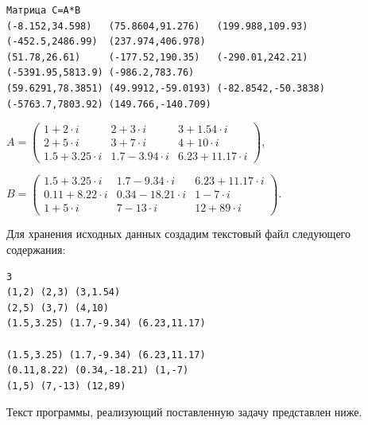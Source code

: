 \begin{verbatim}
Матрица C=A*B
(-8.152,34.598)   (75.8604,91.276)   (199.988,109.93)    (-452.5,2486.99)  (237.974,406.978)
(51.78,26.61)     (-177.52,190.35)   (-290.01,242.21)    (-5391.95,5813.9) (-986.2,783.76)
(59.6291,78.3851) (49.9912,-59.0193) (-82.8542,-50.3838) (-5763.7,7803.92) (149.766,-140.709)
\end{verbatim}



 $A=\left(\begin{array}{rrr}1+2\cdot i&2+3\cdot i&3+1.54\cdot i\\2+5\cdot i&3+7\cdot i&4+10\cdot i\\1.5+3.25\cdot
i&1.7-3.94\cdot i&6.23+11.17\cdot i\end{array}\right)$,

 $B=\left(\begin{array}{rrr}1.5+3.25\cdot i&1.7-9.34\cdot i&6.23+11.17\cdot i\\0.11+8.22\cdot i&0.34-18.21\cdot i&1-7\cdot
i\\1+5\cdot i&7-13\cdot i&12+89\cdot i\end{array}\right)$.

Для хранения исходных данных создадим текстовый файл  %
следующего содержания:
\label{ch09:file1}\begin{verbatim}
3
(1,2) (2,3) (3,1.54)
(2,5) (3,7) (4,10)
(1.5,3.25) (1.7,-9.34) (6.23,11.17)

(1.5,3.25) (1.7,-9.34) (6.23,11.17)
(0.11,8.22) (0.34,-18.21) (1,-7)
(1,5) (7,-13) (12,89)
\end{verbatim}

Текст программы, реализующий поставленную задачу представлен ниже. 

